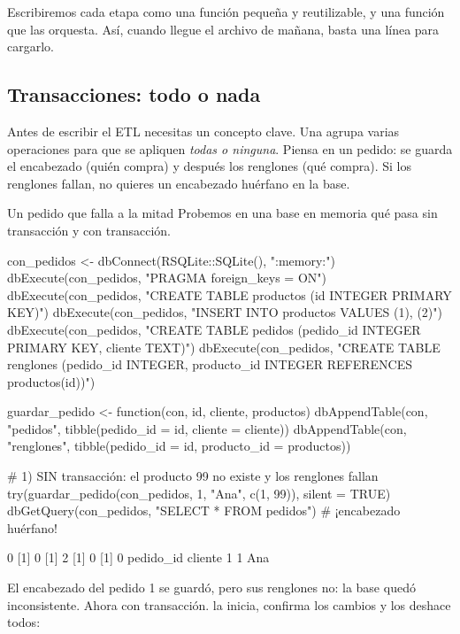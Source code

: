 Escribiremos cada etapa como una función pequeña y reutilizable, y una
función  que las orquesta. Así, cuando llegue el
archivo de mañana, basta una línea para cargarlo.

\subsection{Transacciones: todo o nada}

Antes de escribir el ETL necesitas un concepto clave. Una
 agrupa varias operaciones para que se apliquen
\emph{todas o ninguna}. Piensa en un pedido: se guarda el encabezado (quién
compra) y después los renglones (qué compra). Si los renglones fallan, no
quieres un encabezado huérfano en la base.

\begin{ejemplo}{Un pedido que falla a la mitad}
Probemos en una base en memoria qué pasa sin transacción y con transacción.
\end{ejemplo}

\begin{rcode}
con_pedidos <- dbConnect(RSQLite::SQLite(), ":memory:")
dbExecute(con_pedidos, "PRAGMA foreign_keys = ON")
dbExecute(con_pedidos, "CREATE TABLE productos (id INTEGER PRIMARY KEY)")
dbExecute(con_pedidos, "INSERT INTO productos VALUES (1), (2)")
dbExecute(con_pedidos, "CREATE TABLE pedidos (pedido_id INTEGER
                          PRIMARY KEY, cliente TEXT)")
dbExecute(con_pedidos, "CREATE TABLE renglones (pedido_id INTEGER,
            producto_id INTEGER REFERENCES productos(id))")

guardar_pedido <- function(con, id, cliente, productos) {
  dbAppendTable(con, "pedidos", tibble(pedido_id = id,
                                       cliente = cliente))
  dbAppendTable(con, "renglones", tibble(pedido_id = id,
                                         producto_id = productos))
}

# 1) SIN transacción: el producto 99 no existe y los renglones fallan
try(guardar_pedido(con_pedidos, 1, "Ana", c(1, 99)), silent = TRUE)
dbGetQuery(con_pedidos, "SELECT * FROM pedidos")   # ¡encabezado huérfano!
\end{rcode}

\begin{rsalida}
[1] 0
[1] 0
[1] 2
[1] 0
[1] 0
  pedido_id cliente
1         1     Ana
\end{rsalida}

El encabezado del pedido 1 se guardó, pero sus renglones no: la base quedó
inconsistente. Ahora con transacción.  la inicia,
 confirma los cambios y  los
deshace todos:

